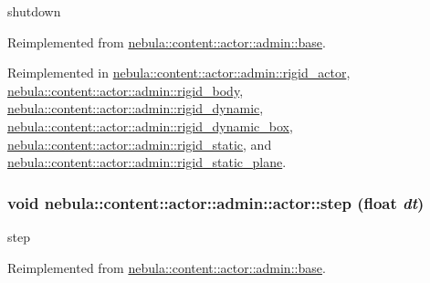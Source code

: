 shutdown 

Reimplemented from \hyperlink{classnebula_1_1content_1_1actor_1_1admin_1_1base_a5f8943404407602a6757d3ab448d4a75}{nebula::content::actor::admin::base}.

Reimplemented in \hyperlink{classnebula_1_1content_1_1actor_1_1admin_1_1rigid__actor_afe9a6592087cac6054f6416d7c617eaa}{nebula::content::actor::admin::rigid\_\-actor}, \hyperlink{classnebula_1_1content_1_1actor_1_1admin_1_1rigid__body_ab0ed9e145b42efdd0049e2e1ef7d5da4}{nebula::content::actor::admin::rigid\_\-body}, \hyperlink{classnebula_1_1content_1_1actor_1_1admin_1_1rigid__dynamic_a6b7e8768902a320d8f7f483cf348a059}{nebula::content::actor::admin::rigid\_\-dynamic}, \hyperlink{classnebula_1_1content_1_1actor_1_1admin_1_1rigid__dynamic__box_af3ecd05192435e30fbe258f243d18adc}{nebula::content::actor::admin::rigid\_\-dynamic\_\-box}, \hyperlink{classnebula_1_1content_1_1actor_1_1admin_1_1rigid__static_a813d55717971528046af12804e01ff4e}{nebula::content::actor::admin::rigid\_\-static}, and \hyperlink{classnebula_1_1content_1_1actor_1_1admin_1_1rigid__static__plane_a40139ed218560b51d64612559be0564d}{nebula::content::actor::admin::rigid\_\-static\_\-plane}.\hypertarget{classnebula_1_1content_1_1actor_1_1admin_1_1actor_af4b68cdf9481cd0ad5f56a78bb691997}{
\subsubsection[{step}]{\setlength{\rightskip}{0pt plus 5cm}void nebula::content::actor::admin::actor::step (float {\em dt})}}
\label{classnebula_1_1content_1_1actor_1_1admin_1_1actor_af4b68cdf9481cd0ad5f56a78bb691997}


step 

Reimplemented from \hyperlink{classnebula_1_1content_1_1actor_1_1admin_1_1base_ac66cc3aa153fa2d6e45f1195d2027052}{nebula::content::actor::admin::base}.


